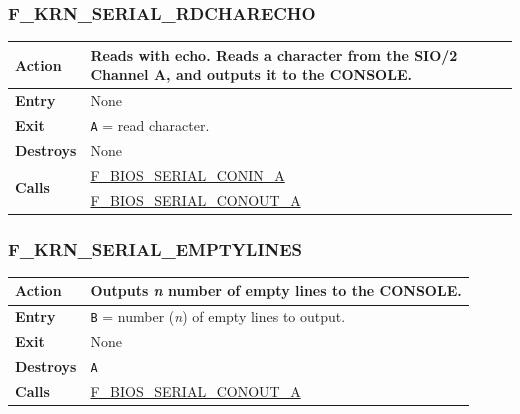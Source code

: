 \documentclass[a4paper,11pt]{article}
\begin{document}
        \subsubsection{F\_KRN\_SERIAL\_RDCHARECHO}
        \label{func:fkrnserialrdcharecho}
        \begin{tabular}{l p{9cm}}
            \hline\textbf{Action}
            & Reads with echo. Reads a character from the \textbf{SIO/2} Channel
            A, and outputs it to the \textbf{CONSOLE}.\\
            \hline\textbf{Entry} & None \\
            \hline\textbf{Exit} & \texttt{A} = read character. \\
            \hline\textbf{Destroys} & None \\
            \hline\multirow[t]{2}{4em}{\textbf{Calls}}
            & \hyperref[func:fbiosserialconina]{F\_BIOS\_SERIAL\_CONIN\_A}\\
            & \hyperref[func:fbiosserialconouta]{F\_BIOS\_SERIAL\_CONOUT\_A}\\
            \hline
        \end{tabular}

        \subsubsection{F\_KRN\_SERIAL\_EMPTYLINES}
        \label{func:fkrnserialemptylines}
        \begin{tabular}{l p{9cm}}
            \hline\textbf{Action}
            & Outputs \textit{n} number of empty lines to the \textbf{CONSOLE}.\\
            \hline\textbf{Entry} & \texttt{B} = number (\textit{n}) of empty
            lines to output. \\
            \hline\textbf{Exit} & None \\
            \hline\textbf{Destroys} & \texttt{A} \\
            \hline\textbf{Calls}
            & \hyperref[func:fbiosserialconouta]{F\_BIOS\_SERIAL\_CONOUT\_A}\\
            \hline
        \end{tabular}
\end{document}
